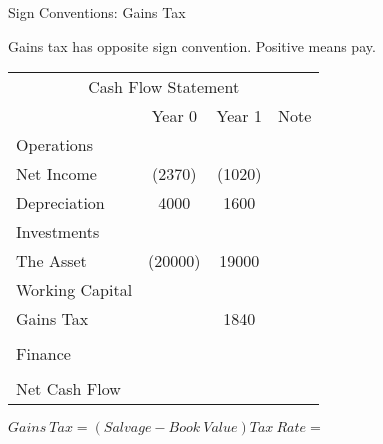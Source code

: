 \documentclass[ignorenonframetext,]{beamer}
\begin{document}
\begin{frame}{Sign Conventions: Gains Tax}

Gains tax has opposite sign convention. Positive means pay.

\begin{table}
\begin{tabular}{l||c|c||p{3cm}}
        \multicolumn{4}{c}{Cash Flow Statement}\\
  &Year 0  &Year 1  &Note\\        
    Operations& &   &\\
    \hspace{.25in}Net Income    &   (2370)& (1020)&\\
    \hspace{.25in}Depreciation  &   4000&   1600&\\
    Investments &   &   &\\
\hspace{.25in}The Asset         &(20000)    &   19000&\\
\hspace{.25in}Working Capital   &   &   &\\
        \hspace{.25in}Gains Tax &   &1840   &\\
            &   &   &\\
        
    Finance &   &   &\\
            &   &   &\\
        \hline
        Net Cash Flow   &   &   &\\
\end{tabular}
\end{table}

\(Gains~Tax = (Salvage - Book~Value) Tax~Rate =\)

\end{frame}
\end{document}
